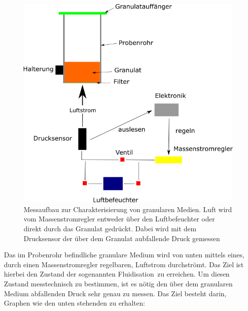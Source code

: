 \begin{figure}[h!]
		\begin{center}
		\includegraphics[scale=0.5]{Prinzip_Wirbelbett.png}
		\caption{Messaufbau zur Charakterisierung von granularen Medien. Luft wird vom Massenstromregler entweder über den Luftbefeuchter oder direkt durch das Granulat gedrückt. Dabei wird mit dem Drucksensor der über dem Granulat aubfallende Druck gemessen}
	\end{center}
\end{figure}	


Das im Probenrohr befindliche granulare Medium wird von unten mittels eines, durch einen Massenstromregler regelbaren, Luftstrom durchströmt. Das Ziel ist hierbei den Zustand der sogenannten \glqq Fluidisation\grqq \ zu erreichen. Um diesen Zustand messtechnisch zu bestimmen, ist es nötig den über dem granularen Medium abfallenden Druck sehr genau zu messen. Das Ziel besteht darin, Graphen wie den unten stehenden zu erhalten:

